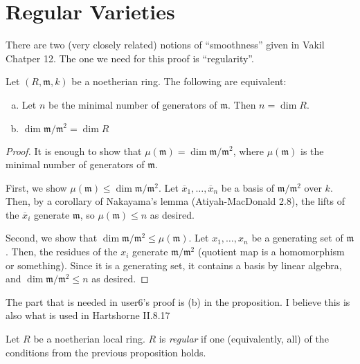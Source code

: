 

\section{Regular Varieties}

There are two (very closely related)
notions of ``smoothness'' given in Vakil Chatper 12.
The one we need for this proof is ``regularity''.

\begin{prop}
	Let \((R,\mathfrak{m},k)\) be a noetherian ring. 
	The following are equivalent:
	\begin{enumerate}[(a)]
		\item Let \(n\) be the minimal number of generators of
			\(\mathfrak{m}\).
			Then \(n = \dim R\).
		\item \(\dim \mathfrak{m} / \mathfrak{m}^{2}  = \dim R\)
	\end{enumerate}
\end{prop}

\begin{proof}
	It is enough to show that 
	\(\mu(\mathfrak{m}) = \dim \mathfrak{m} / \mathfrak{m}^{2}\),
	where \(\mu(\mathfrak{m})\) is the minimal number of generators
	of \(\mathfrak{m}\).
	
	First, we show \(\mu(\mathfrak{m}) \leq \dim \mathfrak{m} / \mathfrak{m}^{2}\).
	Let \(\overline{x}_{1}, \ldots, \overline{x}_{n}\) 
	be a basis of \(\mathfrak{m} / \mathfrak{m}^{2}\) 
	over \(k\).
	Then, by a corollary of Nakayama's lemma (Atiyah-MacDonald 2.8),
	the lifts of the \(\overline{x}_{i}\) generate \(\mathfrak{m}\),
	so \(\mu(\mathfrak{m}) \leq n\) as desired.

	Second, we show that 
	\(\dim \mathfrak{m} / \mathfrak{m}^{2} \leq \mu(\mathfrak{m})\).
	Let \(x_{1}, \ldots, x_{n}\) be a generating set of 
	\(\mathfrak{m}\).
	Then, the residues of the \(x_{i}\) generate 
	\(\mathfrak{m} / \mathfrak{m}^{2}\) (quotient map is a 
	homomorphism or something).
	Since it is a generating set, it contains a basis by
	linear algebra, and
	\(\dim \mathfrak{m} / \mathfrak{m}^{2} \leq n\) as desired.
\end{proof}

The part that is needed in user6's proof is (b) in the proposition.
I believe this is also what is used in Hartshorne II.8.17

\begin{defn}
	Let \(R\) be a noetherian local ring.
	\(R\) is \textit{regular} if one (equivalently, all)
	of the conditions from the previous proposition holds.
\end{defn}

